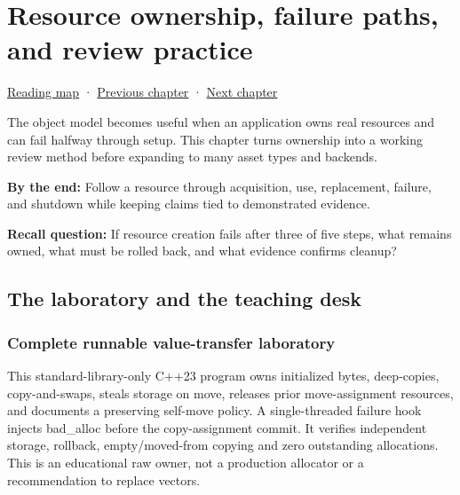 \chapter{Resource ownership, failure paths, and review practice}\label{05-engine-i-ch004-resource-ownership-failure-paths-and-review-practice}\hypertarget{05-engine-i-ch004}{}\label{stagechapter:05-engine-i-ch004}

\hypertarget{05-engine-i-ch004-resource-ownership-failure-paths-and-review-practice}{}

\hyperref[volume-reading-map]{Reading map} · \hyperref[05-engine-i-ch003-object-representation-lifetime-and-enforceable-promises]{Previous chapter} · \hyperref[05-engine-i-ch005-generic-asset-pipelines-with-stable-identity]{Next chapter}

The object model becomes useful when an application owns real resources and can fail halfway through setup. This chapter turns ownership into a working review method before expanding to many asset types and backends.

\textbf{By the end:} Follow a resource through acquisition, use, replacement, failure, and shutdown while keeping claims tied to demonstrated evidence.

\textbf{Recall question:} If resource creation fails after three of five steps, what remains owned, what must be rolled back, and what evidence confirms cleanup?

\section{The laboratory and the teaching desk}\label{05-engine-i-ch004-the-laboratory-and-the-teaching-desk}

\hypertarget{05-engine-i-ch004-the-laboratory-and-the-teaching-desk}{}

\subsection{Complete runnable value-transfer laboratory}\label{05-engine-i-ch004-complete-runnable-value-transfer-laboratory}

\hypertarget{05-engine-i-ch004-complete-runnable-value-transfer-laboratory}{}

This standard-library-only C++23 program owns initialized bytes, deep-copies, copy-and-swaps, steals storage on move, releases prior move-assignment resources, and documents a preserving self-move policy. A single-threaded failure hook injects bad\_alloc before the copy-assignment commit. It verifies independent storage, rollback, empty/moved-from copying and zero outstanding allocations. This is an educational raw owner, not a production allocator or a recommendation to replace vectors.

